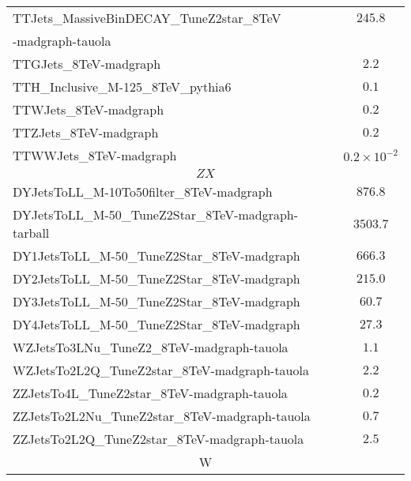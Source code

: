 \begin{table}[!Hhtb]
\begin{center}
{\begin{tabular}{|l|c|}
TTJets\_MassiveBinDECAY\_TuneZ2star\_8TeV  &  $245.8$       \\
-madgraph-tauola                                        &               \\
TTGJets\_8TeV-madgraph                                  &  $2.2$              \\%
TTH\_Inclusive\_M-125\_8TeV\_pythia6                    &  $0.1$               \\
TTWJets\_8TeV-madgraph                                  &  $0.2$              \\
TTZJets\_8TeV-madgraph                                  &  $0.2$                \\
TTWWJets\_8TeV-madgraph                                 &  $0.2\times 10^{-2}$                \\

\hline\hline
\multicolumn{2}{|c|}{$ZX$ }\\
\hline\hline
DYJetsToLL\_M-10To50filter\_8TeV-madgraph      &   $876.8$               \\
DYJetsToLL\_M-50\_TuneZ2Star\_8TeV-madgraph-tarball    &   $3503.7$               \\
DY1JetsToLL\_M-50\_TuneZ2Star\_8TeV-madgraph           &   $666.3$               \\
DY2JetsToLL\_M-50\_TuneZ2Star\_8TeV-madgraph           &   $215.0$               \\
DY3JetsToLL\_M-50\_TuneZ2Star\_8TeV-madgraph           &   $60.7$               \\
DY4JetsToLL\_M-50\_TuneZ2Star\_8TeV-madgraph           &   $27.3$               \\
WZJetsTo3LNu\_TuneZ2\_8TeV-madgraph-tauola             &  $1.1$                \\
WZJetsTo2L2Q\_TuneZ2star\_8TeV-madgraph-tauola         &  $2.2$                \\
ZZJetsTo4L\_TuneZ2star\_8TeV-madgraph-tauola           &  $0.2$                \\
ZZJetsTo2L2Nu\_TuneZ2star\_8TeV-madgraph-tauola        &  $0.7$                \\
ZZJetsTo2L2Q\_TuneZ2star\_8TeV-madgraph-tauola         &  $2.5$                \\
\hline\hline
\multicolumn{2}{|c|}{W}\\
\hline\hline


\end{tabular}}
\end{center}
\end{table}
